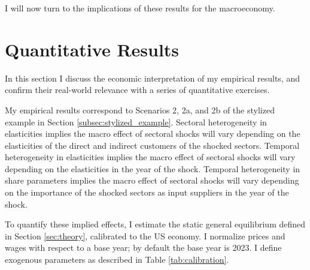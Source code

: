 \documentclass[11pt]{article}
\begin{document}
I will now turn to the implications of these results for the macroeconomy. 

\section{Quantitative Results}
\label{sec:discussion}

In this section I discuss the economic interpretation of my empirical results, and confirm their real-world relevance with a series of quantitative exercises.

My empirical results correspond to Scenarios 2, 2a, and 2b of the stylized example in Section \ref{subsec:stylized_example}. Sectoral heterogeneity in elasticities implies the macro effect of sectoral shocks will vary depending on the elasticities of the direct and indirect customers of the shocked sectors. Temporal heterogeneity in elasticities implies the macro effect of sectoral shocks will vary depending on the elasticities in the year of the shock. Temporal heterogeneity in share parameters implies the macro effect of sectoral shocks will vary depending on the importance of the shocked sectors as input suppliers in the year of the shock. 

To quantify these implied effects, I estimate the static general equilibrium defined in Section \ref{sec:theory}, calibrated to the US economy. I normalize prices and wages with respect to a base year; by default the base year is 2023. I define exogenous parameters as described in Table \ref{tab:calibration}.
\end{document}
